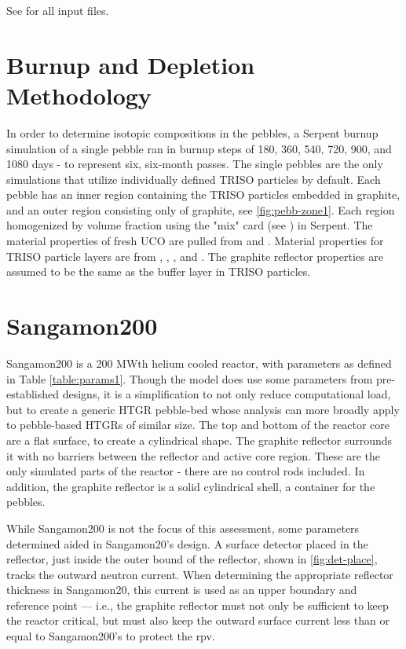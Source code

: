 

See \cite{richter_zoerichterphlox_2021} for all input files.

\section{Burnup and Depletion Methodology}
In order to determine isotopic compositions in the pebbles, a Serpent burnup simulation of a single pebble ran in burnup steps of 180, 360, 540, 720, 900, and 1080 days - to represent six, six-month passes.  The single pebbles are the only simulations that utilize individually defined TRISO particles by default.  Each pebble has an inner region containing the TRISO particles embedded in graphite, and an outer region consisting only of graphite, see \ref{fig:pebb-zone1}.  Each region homogenized by volume fraction using the "mix" card (see \cite{leppanenjaakko_serpent_2015}) in Serpent.  The material properties of fresh UCO are pulled from \cite{helmreich_year_2017} and \cite{nagley_fabrication_2010}.  Material properties for TRISO particle layers are from \cite{accuratus_silicon_2013}, \cite{espi_metals_graphite-pyrolytic_2019}, \cite{ho_graphite_1988}, and \cite{johnson_properties_1976}.  The graphite reflector properties are assumed to be the same as the buffer layer in TRISO particles.




\section{Sangamon200}
Sangamon200 is a 200 MWth helium cooled reactor, with parameters as defined in Table \ref{table:params1}.  Though the model does use some parameters from pre-established designs, it is a simplification to not only reduce computational load, but to create a generic HTGR pebble-bed whose analysis can more broadly apply to pebble-based HTGRs of similar size.  The top and bottom of the reactor core are a flat surface, to create a cylindrical shape.  The graphite reflector surrounds it with no barriers between the reflector and active core region. These are the only simulated parts of the reactor - there are no control rods included.  In addition, the graphite reflector is a solid cylindrical shell, a container for the pebbles.



While Sangamon200 is not the focus of this assessment, some parameters determined aided in Sangamon20's design.  A surface detector placed in the reflector, just inside the outer bound of the reflector, shown in \ref{fig:det-place}, tracks the outward neutron current.  When determining the appropriate reflector thickness in Sangamon20, this current is used as an upper boundary and reference point --- i.e., the graphite reflector must not only be sufficient to keep the reactor critical, but must also keep the outward surface current less than or equal to Sangamon200's to protect the \acrshort{rpv}.

